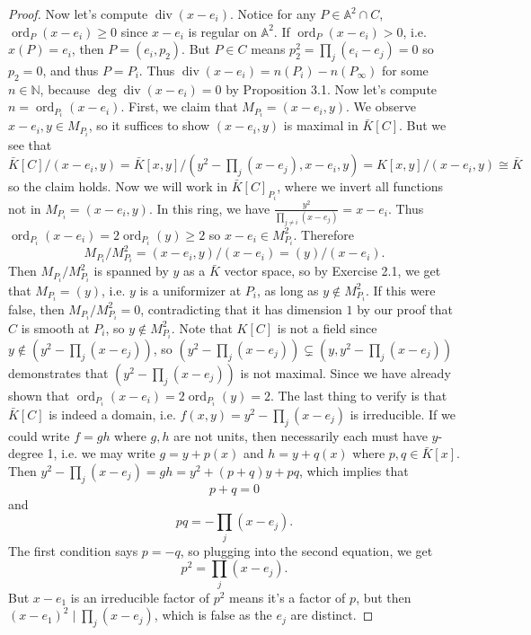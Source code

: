 \documentclass{article}
\theoremstyle{customplain}
\theoremstyle{customdef}
\renewcommand{\div}{\mathop{\mathrm{div}}}
\newcommand{\A}{\mathbb{A}}
\newcommand{\N}{\mathbb{N}}
\DeclareMathOperator{\ord}{ord}
\theoremstyle{definition} %
\renewcommand{\ge}{\geqslant}
\begin{document}
\begin{proof}
    Now let's compute $\div(x-e_i)$. Notice for any $P\in \A^2\cap C$, $\ord_P(x-e_i)\ge 0$ since $x-e_i$ is regular on $\A^2.$ If $\ord_P(x-e_i)>0$, i.e. $x(P)=e_i$, then $P=(e_i, p_2)$. But $P\in C$ means $p_2^2=\prod_j (e_i-e_j)=0$ so $p_2=0$, and thus $P=P_i.$ Thus $\div(x-e_i)=n(P_i)-n(P_\infty)$ for some $n\in \N$, because $\deg \div (x-e_i)=0$ by Proposition 3.1. Now let's compute $n=\ord_{P_i}(x-e_i).$ First, we claim that $M_{P_i} = (x-e_i,y).$ We observe $x-e_i,y\in M_{P_i}$, so it suffices to show $(x-e_i,y)$ is maximal in $\bar K[C]$. But we see that $\bar K[C]/(x-e_i, y)=\bar K[x,y]/(y^2-\prod_j(x-e_j), x-e_i, y)=K[x,y]/(x-e_i, y)\cong \bar K$ so the claim holds. Now we will work in $\bar K[C]_{P_i}$, where we invert all functions not in $M_{P_i}=(x-e_i, y).$ In this ring, we have $\frac{y^2}{\prod_{j\ne i}(x-e_j)} = x-e_i$. Thus $\ord_{P_i}(x-e_i)=2\ord_{P_i}(y)\ge 2$ so $x-e_i\in M_{P_i}^2.$ Therefore
    \[
    M_{P_i}/M_{P_i}^2 = (x-e_i, y)/(x-e_i) = (y)/(x-e_i).
    \]
    Then $M_{P_i}/M_{P_i}^2 $ is spanned by $y$ as a $\bar K$ vector space, so by Exercise 2.1, we get that $M_{P_i}=(y)$, i.e. $y$ is a uniformizer at $P_i$, as long as $y\notin M_{P_i}^2.$ If this were false, then $M_{P_i}/M_{P_i}^2=0$, contradicting that it has dimension $1$ by our proof that $C$ is smooth at $P_i$, so $y\notin M_{P_i}^2.$ Note that $K[C]$ is not a field since $y\notin (y^2-\prod_j(x-e_j))$, so $(y^2-\prod_j(x-e_j))\subsetneq (y, y^2-\prod_j (x-e_j)) $ demonstrates that $(y^2-\prod_j (x-e_j))$ is not maximal. Since we have already shown that $\ord_{P_i}(x-e_i)=2\ord_{P_i}(y)=2$. The last thing to verify is that $\bar K[C]$ is indeed a domain, i.e. $f(x,y)=y^2-\prod_j(x-e_j)$ is irreducible. If we could write $f=gh$ where $g,h$ are not units, then necessarily each must have $y$-degree 1, i.e. we may write $g=y+p(x)$ and $h=y+q(x)$ where $p,q\in \bar K[x].$ Then $y^2-\prod_j(x-e_j)=gh=y^2+(p+q)y+pq$, which implies that
    \[
    p+q=0
    \]
    and
    \[
    pq=-\prod_j(x-e_j).
    \]
    The first condition says $p=-q$, so plugging into the second equation, we get
    \[
    p^2 = \prod_j(x-e_j).
    \]
    But $x-e_1$ is an irreducible factor of $p^2$ means it's a factor of $p$, but then $(x-e_1)^2\mid \prod_j(x-e_j)$, which is false as the $e_j$ are distinct.
    

\end{proof}
\end{document}
